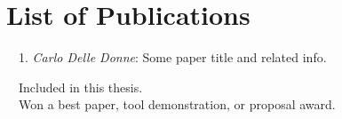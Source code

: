 \chapter*{List of Publications}
\label{publications}

\begin{etaremune}
    \item[\faFileTextO~~1.] \emph{Carlo Delle Donne}: Some paper title and related info.
\end{etaremune}

\vspace{0.5cm}
\noindent
\faFileTextO~~Included in this thesis.\\
\faTrophy~~Won a best paper, tool demonstration, or proposal award.
